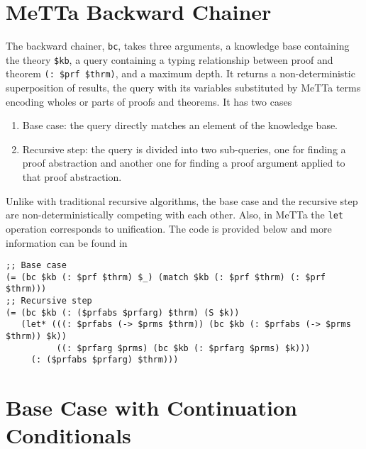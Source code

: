 \documentclass{easychair}
\begin{document}


\newpage


\label{sect:bib}
%
%
%


\newpage

\appendix
\section{MeTTa Backward Chainer}
\label{app:metta-backward-chainer}

The backward chainer, \texttt{bc}, takes three arguments, a knowledge
base containing the theory \texttt{\$kb}, a query containing a typing
relationship between proof and theorem \texttt{(: \$prf \$thrm)}, and
a maximum depth.  It returns a non-deterministic superposition of
results, the query with its variables substituted by MeTTa terms
encoding wholes or parts of proofs and theorems.  It has two cases
\begin{enumerate}
\item Base case: the query directly matches an element of the
  knowledge base.
\item Recursive step: the query is divided into two sub-queries, one
  for finding a proof abstraction and another one for finding a proof
  argument applied to that proof abstraction.
\end{enumerate}
Unlike with traditional recursive algorithms, the base case and the
recursive step are non-deterministically competing with each other.
Also, in MeTTa the \texttt{let} operation corresponds to unification.
The code is provided below and more information can be found
in~\cite{Geisweiller2024ICM} \small{
\begin{verbatim}
;; Base case
(= (bc $kb (: $prf $thrm) $_) (match $kb (: $prf $thrm) (: $prf $thrm)))
;; Recursive step
(= (bc $kb (: ($prfabs $prfarg) $thrm) (S $k))
   (let* (((: $prfabs (-> $prms $thrm)) (bc $kb (: $prfabs (-> $prms $thrm)) $k))
          ((: $prfarg $prms) (bc $kb (: $prfarg $prms) $k)))
     (: ($prfabs $prfarg) $thrm)))
\end{verbatim}
}

\section{Base Case with Continuation Conditionals}
\label{app:backward-chainer-continuation-conditionals}
\end{document}
